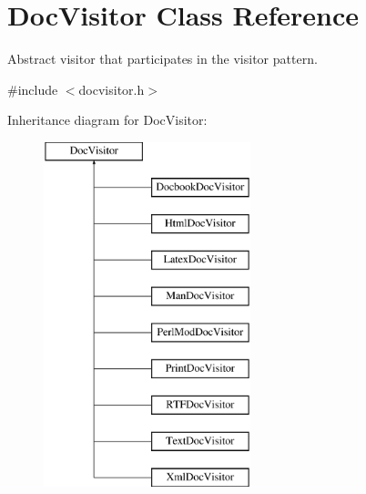 \hypertarget{class_doc_visitor}{}\section{Doc\+Visitor Class Reference}
\label{class_doc_visitor}


Abstract visitor that participates in the visitor pattern.  




{\ttfamily \#include $<$docvisitor.\+h$>$}

Inheritance diagram for Doc\+Visitor\+:\begin{figure}[H]
\begin{center}
\leavevmode
\includegraphics[height=10.000000cm]{class_doc_visitor}
\end{center}
\end{figure}
